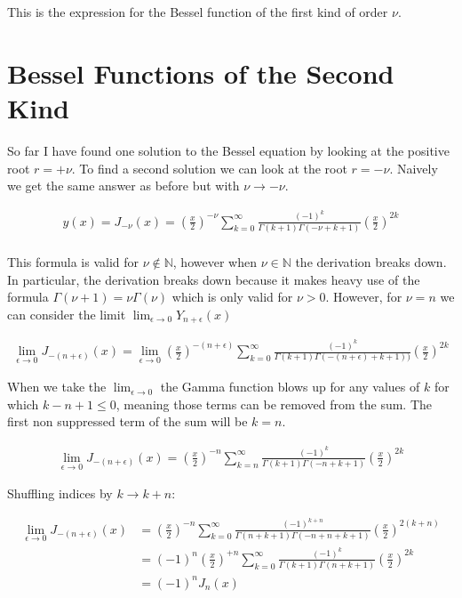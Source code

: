 \documentclass[12pt]{article}
\begin{document}
This is the expression for the Bessel function of the first kind of order $\nu$.

\section{Bessel Functions of the Second Kind}

So far I have found one solution to the Bessel equation by looking at the positive root $r=+\nu$. To find a second solution we can look at the root $r=-\nu$. Naively we get the same answer as before but with $\nu\rightarrow -\nu$.

\begin{align}
y(x) = J_{-\nu}(x)
= \left(\frac{x}{2}\right)^{-\nu} \sum_{k=0}^{\infty}\frac{(-1)^k}{\Gamma(k+1)\Gamma(-\nu+k+1)}\left(\frac{x}{2}\right)^{2k}\\
\end{align}

This formula is valid for $\nu \notin \mathbb{N}$, however when $\nu \in \mathbb{N}$ the derivation breaks down. In particular, the derivation breaks down because it makes heavy use of the formula $\Gamma(\nu+1) = \nu \Gamma(\nu)$ which is only valid for $\nu>0$. However, for $\nu = n$ we can consider the limit $\lim_{\epsilon \rightarrow 0}Y_{n+\epsilon}(x)$

\begin{align}
\lim_{\epsilon \rightarrow 0}J_{-(n+\epsilon)}(x) = \lim_{\epsilon \rightarrow 0} \left(\frac{x}{2}\right)^{-(n+\epsilon)} \sum_{k=0}^{\infty} \frac{(-1)^{k}}{\Gamma(k+1) \Gamma(-(n+\epsilon) + k +1))} \left(\frac{x}{2}\right)^{2k}
\end{align}

When we take the $\lim_{\epsilon \rightarrow 0}$ the Gamma function blows up for any values of $k$ for which $k-n +1 \le 0$, meaning those terms can be removed from the sum. The first non suppressed term of the sum will be $k=n$.

\begin{align}
\lim_{\epsilon \rightarrow 0}J_{-(n+\epsilon)}(x) = \left(\frac{x}{2}\right)^{-n} \sum_{k=n}^{\infty} \frac{(-1)^k}{\Gamma(k+1) \Gamma(-n + k +1)} \left(\frac{x}{2}\right)^{2k}
\end{align}

Shuffling indices by $k \rightarrow k+n$:

\begin{align}
\lim_{\epsilon \rightarrow 0}J_{-(n+\epsilon)}(x) &= \left(\frac{x}{2}\right)^{-n} \sum_{k=0}^{\infty} \frac{(-1)^{k+n}}{\Gamma(n+k+1) \Gamma(-n + n + k +1)} \left(\frac{x}{2}\right)^{2(k+n)}\\
&= (-1)^{n}\left(\frac{x}{2}\right)^{+n} \sum_{k=0}^{\infty} \frac{(-1)^{k}}{\Gamma(k+1) \Gamma(n+k+1)} \left(\frac{x}{2}\right)^{2k} \\
&= (-1)^{n} J_{n}(x)
\end{align}
\end{document}
